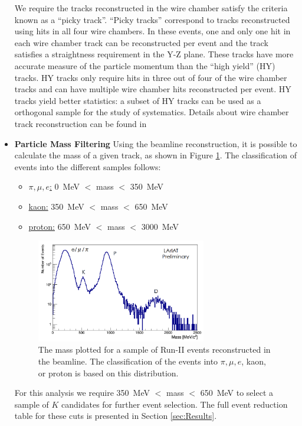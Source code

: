 \begin{itemize}
We require the tracks reconstructed in the wire chamber satisfy the criteria known as a ``picky track''. ``Picky tracks'' correspond to tracks reconstructed using hits in all four wire chambers. In these events, one and only one hit in each wire chamber track can be reconstructed per event and the track satisfies a straightness requirement in the Y-Z plane. These tracks have more accurate measure of the particle momentum than the ``high yield'' (HY) tracks.  HY tracks only require hits in three out of four of the wire chamber tracks and can have multiple wire chamber hits reconstructed per event. HY tracks yield better statistics: a subset of HY tracks can be used as a orthogonal sample for the study of systematics. Details about wire chamber track reconstruction can be found in \cite{WCTrackReco}

\item \textbf{Particle Mass Filtering}
Using the beamline reconstruction, it is possible to calculate the mass of a given track, as shown in Figure \ref{fig:mass}. The classification of events into the different samples follows:

\begin{itemize}
\item \underline{$\pi, \mu, e$:} 0~MeV $<$ mass $<$ 350~MeV

\item \underline{kaon:} 350~MeV $<$ mass $<$ 650~MeV

\item \underline{proton:} 650~MeV $<$ mass $<$ 3000~MeV

\end{itemize}

\begin{figure}[htb]
\centering
\includegraphics[width=0.70\textwidth]{images/mass.png}
\caption{The mass plotted for a sample of Run-II events reconstructed in the beamline. The classification of the events into $\pi, \mu, e$, kaon, or proton is based on this distribution.}
\label{fig:mass}
\end{figure}

For this analysis we require 350~MeV $<$ mass $<$ 650~MeV to select a sample of $K$ candidates for further event selection. The full event reduction table for these cuts is presented in Section \ref{sec:Results}.

\end{itemize}


